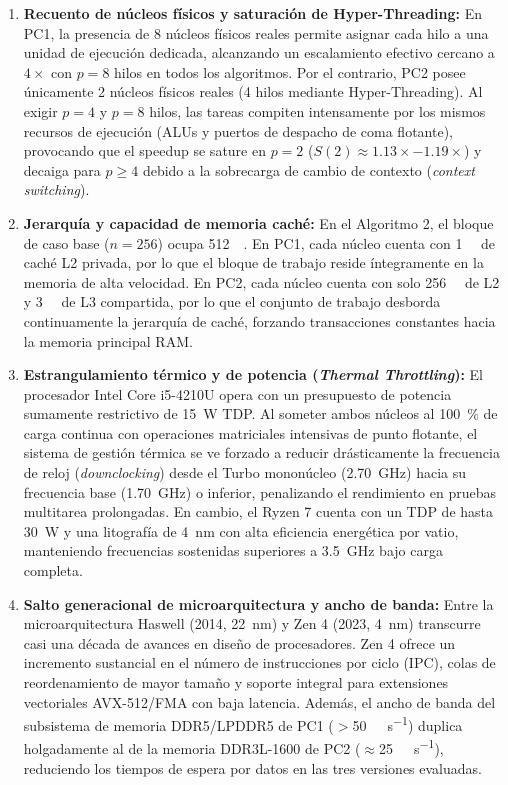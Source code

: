 \begin{enumerate}
    \item \textbf{Recuento de núcleos físicos y saturación de Hyper-Threading:}
    En PC1, la presencia de 8 núcleos físicos reales permite asignar cada hilo a una unidad de ejecución dedicada, alcanzando un escalamiento efectivo cercano a $4\times$ con $p=8$ hilos en todos los algoritmos. Por el contrario, PC2 posee únicamente 2 núcleos físicos reales (4 hilos mediante Hyper-Threading). Al exigir $p=4$ y $p=8$ hilos, las tareas compiten intensamente por los mismos recursos de ejecución (ALUs y puertos de despacho de coma flotante), provocando que el speedup se sature en $p=2$ ($S(2) \approx 1.13\times - 1.19\times$) y decaiga para $p \ge 4$ debido a la sobrecarga de cambio de contexto (\emph{context switching}).

    \item \textbf{Jerarquía y capacidad de memoria caché:}
    En el Algoritmo 2, el bloque de caso base ($n=256$) ocupa \SI{512}{\kibi\byte}. En PC1, cada núcleo cuenta con \SI{1}{\mebi\byte} de caché L2 privada, por lo que el bloque de trabajo reside íntegramente en la memoria de alta velocidad. En PC2, cada núcleo cuenta con solo \SI{256}{\kibi\byte} de L2 y \SI{3}{\mebi\byte} de L3 compartida, por lo que el conjunto de trabajo desborda continuamente la jerarquía de caché, forzando transacciones constantes hacia la memoria principal RAM.

    \item \textbf{Estrangulamiento térmico y de potencia (\emph{Thermal Throttling}):}
    El procesador Intel Core i5-4210U opera con un presupuesto de potencia sumamente restrictivo de \SI{15}{\watt} TDP. Al someter ambos núcleos al \SI{100}{\percent} de carga continua con operaciones matriciales intensivas de punto flotante, el sistema de gestión térmica se ve forzado a reducir drásticamente la frecuencia de reloj (\emph{downclocking}) desde el Turbo mononúcleo (\SI{2.70}{\giga\hertz}) hacia su frecuencia base (\SI{1.70}{\giga\hertz}) o inferior, penalizando el rendimiento en pruebas multitarea prolongadas. En cambio, el Ryzen 7 cuenta con un TDP de hasta \SI{30}{\watt} y una litografía de \SI{4}{\nano\meter} con alta eficiencia energética por vatio, manteniendo frecuencias sostenidas superiores a \SI{3.5}{\giga\hertz} bajo carga completa.

    \item \textbf{Salto generacional de microarquitectura y ancho de banda:}
    Entre la microarquitectura Haswell (2014, \SI{22}{\nano\meter}) y Zen 4 (2023, \SI{4}{\nano\meter}) transcurre casi una década de avances en diseño de procesadores. Zen 4 ofrece un incremento sustancial en el número de instrucciones por ciclo (IPC), colas de reordenamiento de mayor tamaño y soporte integral para extensiones vectoriales AVX-512/FMA con baja latencia. Además, el ancho de banda del subsistema de memoria DDR5/LPDDR5 de PC1 ($>$\SI{50}{\giga\byte\per\second}) duplica holgadamente al de la memoria DDR3L-1600 de PC2 ($\approx$\SI{25}{\giga\byte\per\second}), reduciendo los tiempos de espera por datos en las tres versiones evaluadas.
\end{enumerate}
